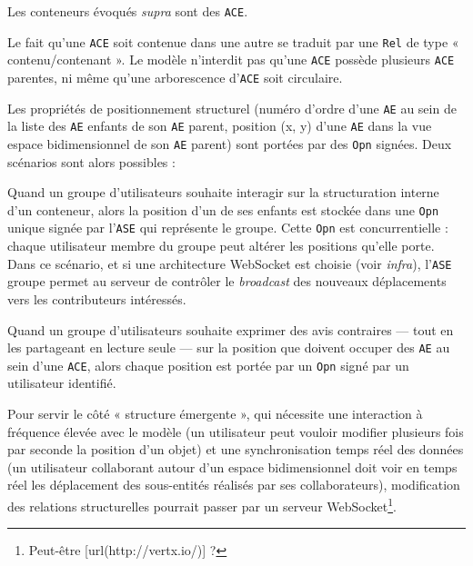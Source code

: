 Les conteneurs évoqués {\it supra} sont des {\tt ACE}.

Le fait qu'une {\tt ACE} soit contenue dans une autre se traduit par une {\tt Rel} de type « contenu/contenant ».
Le modèle n'interdit pas qu'une {\tt ACE} possède plusieurs {\tt ACE} parentes, ni même qu'une arborescence d'{\tt ACE} soit circulaire.

Les propriétés de positionnement structurel (numéro d'ordre d'une {\tt AE} au sein de la liste des {\tt AE} enfants de son {\tt AE} parent, position (x, y) d'une {\tt AE} dans la vue espace bidimensionnel de son {\tt AE} parent) sont portées par des {\tt Opn} signées.
Deux scénarios sont alors possibles :

\startitemize
	\item
	Quand un groupe d'utilisateurs souhaite interagir sur la structuration interne d'un conteneur, alors la position d'un de ses enfants est stockée dans une {\tt Opn} unique signée par l'{\tt ASE} qui représente le groupe.
	Cette {\tt Opn} est concurrentielle : chaque utilisateur membre du groupe peut altérer les positions qu'elle porte.
	Dans ce scénario, et si une architecture WebSocket est choisie (voir {\it infra}), l'{\tt ASE} groupe permet au serveur de contrôler le {\it broadcast} des nouveaux déplacements vers les contributeurs intéressés.
	\item
	Quand un groupe d'utilisateurs souhaite exprimer des avis contraires --- tout en les partageant en lecture seule --- sur la position que doivent occuper des {\tt AE} au sein d'une {\tt ACE}, alors chaque position est portée par un {\tt Opn} signé par un utilisateur identifié.
\stopitemize

\startsection[title={Éléments d'implémentation}]

Pour servir le côté « structure émergente », qui nécessite une interaction à fréquence élevée avec le modèle (un utilisateur peut vouloir modifier plusieurs fois par seconde la position d'un objet) et une synchronisation temps réel des données (un utilisateur collaborant autour d'un espace bidimensionnel doit voir en temps réel les déplacement des sous-entités réalisés par ses collaborateurs), modification des relations structurelles pourrait passer par un serveur WebSocket\footnote{Peut-être [url(http://vertx.io/)] ?}.